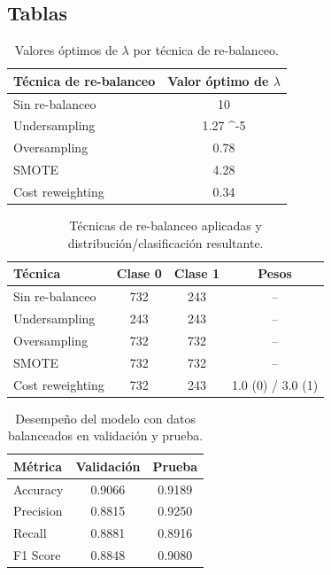 \subsection{Tablas}


\begin{table}[H]
\centering
\caption{Valores óptimos de \(\lambda\) por técnica de re-balanceo.}
\label{tab:optimal_lambda}
\begin{tabular}{lc}
\toprule
\textbf{Técnica de re-balanceo} & \textbf{Valor óptimo de \(\lambda\)} \\
\midrule
Sin re-balanceo        & 10 \\
Undersampling          & 1.27 \times 10^{-5} \\
Oversampling           & 0.78 \\
SMOTE                  & 4.28 \\
Cost reweighting       & 0.34 \\
\bottomrule
\end{tabular}
\end{table}

\begin{table}[H]
\centering
\caption{Técnicas de re-balanceo aplicadas y distribución/clasificación resultante.}
\label{tab:rebalanceo}
\begin{tabular}{lccc}
\toprule
\textbf{Técnica} & \textbf{Clase 0} & \textbf{Clase 1} & \textbf{Pesos} \\
\midrule
Sin re-balanceo       & 732 & 243 & -- \\
Undersampling         & 243 & 243 & -- \\
Oversampling          & 732 & 732 & -- \\
SMOTE                 & 732 & 732 & -- \\
Cost reweighting      & 732 & 243 & 1.0 (0) / 3.0 (1) \\
\bottomrule
\end{tabular}
\end{table}

\begin{table}[H]
\centering
\caption{Desempeño del modelo con datos balanceados en validación y prueba.}
\label{tab:metrics_balanced}
\begin{tabular}{lcc}
\toprule
\textbf{Métrica} & \textbf{Validación} & \textbf{Prueba} \\
\midrule
Accuracy  & 0.9066 & 0.9189 \\
Precision & 0.8815 & 0.9250 \\
Recall    & 0.8881 & 0.8916 \\
F1 Score  & 0.8848 & 0.9080 \\
\bottomrule
\end{tabular}
\end{table}

